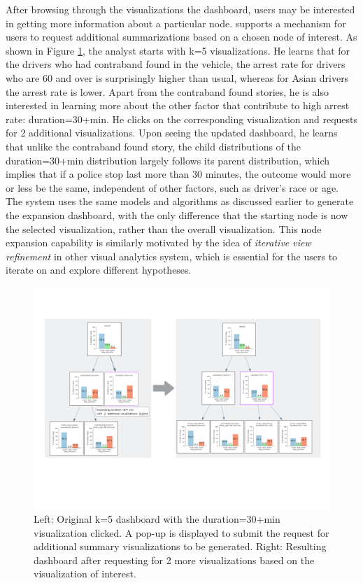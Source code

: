\par After browsing through the visualizations the dashboard, users may be interested in getting more information about a particular node. \system supports a mechanism for users to request additional summarizations based on a chosen node of interest. As shown in Figure \ref{fig:altroot_expansion}, the analyst starts with k=5 visualizations. He learns that for the drivers who had contraband found in the vehicle, the arrest rate for drivers who are 60 and over is surprisingly higher than usual, whereas for Asian drivers the arrest rate is lower. Apart from the contraband found stories, he is also interested in learning more about the other factor that contribute to high arrest rate: duration=30+min. He clicks on the corresponding visualization and requests for 2 additional visualizations. Upon seeing the updated dashboard, he learns that unlike the contraband found story, the child distributions of the duration=30+min distribution largely follows its parent distribution, which implies that if a police stop last more than 30 minutes, the outcome would more or less be the same, independent of other factors, such as driver's race or age. The system uses the same models and algorithms as discussed earlier to generate the expansion dashboard, with the only difference that the starting node is now the selected visualization, rather than the overall visualization. This node expansion capability is similarly motivated by the idea of \textit{iterative view refinement} in other visual analytics system\cite{Wongsuphasawat2016,Hoque2017}, which is essential for the users to iterate on and explore different hypotheses. 
\begin{figure}[ht!]
\centering
\includegraphics[width=\linewidth]{figures/expansion_example.pdf}
\caption{Left: Original k=5 dashboard with the duration=30+min visualization clicked. A pop-up is displayed to submit the request for additional summary visualizations to be generated. Right: Resulting dashboard after requesting for 2 more visualizations based on the visualization of interest.}
\label{fig:altroot_expansion}
\end{figure}

